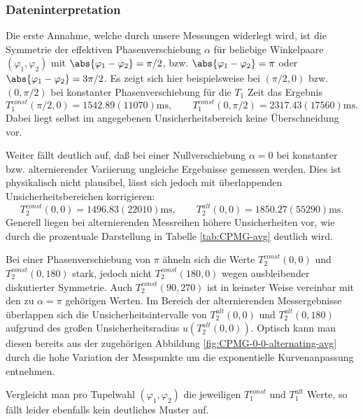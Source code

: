 \documentclass{article}
\begin{document}
        \subsubsection*{Dateninterpretation}
            Die erste Annahme, welche durch unsere Messungen widerlegt wird, ist die Symmetrie der effektiven Phasenverschiebung $\alpha$ für beliebige Winkelpaare $(\varphi_1,\varphi_2)$ mit $\abs{\varphi_1 - \varphi_2} = \pi/2$, bzw. $\abs{\varphi_1 - \varphi_2} = \pi$ oder $\abs{\varphi_1 - \varphi_2} = 3\pi/2$. Es zeigt sich hier beispielsweise bei $(\pi/2,0)$ bzw. $(0,\pi/2)$ bei konstanter Phasenverschiebung für die $T_1$ Zeit das Ergebnis
            \[
                T_1^{\textit{const}}(\pi/2,0) = 1542.89(11070)\si{\ms},\qquad T_1^{\textit{const}}(0,\pi/2) = 2317.43(17560)\si{\ms}.
            \]
            Dabei liegt selbst im angegebenen Unsicherheitsbereich keine Überschneidung vor. 

            Weiter fällt deutlich auf, daß bei einer Nullverschiebung $\alpha = 0$ bei konstanter bzw. alternierender Variierung ungleiche Ergebnisse gemessen werden. Dies ist physikalisch nicht plausibel, lässt sich jedoch mit überlappenden Unsicherheitsbereichen korrigieren:
            \[
                T_2^{\textit{const}}(0,0) = 1496.83(22010)\si{\ms},\qquad T_2^{\textit{alt}}(0,0) = 1850.27(55290)\si{\ms}.
            \]
            Generell liegen bei alternierenden Messreihen höhere Unsicherheiten vor, wie durch die prozentuale Darstellung in Tabelle \ref{tab:CPMG-avg} deutlich wird. 

            Bei einer Phasenverschiebung von $\pi$ ähneln sich die Werte $T_2^{\textit{const}}(0,0)$ und $T_2^{\textit{const}}(0,180)$ stark, jedoch nicht $T_2^{\textit{const}}(180,0)$ wegen ausbleibender diskutierter Symmetrie. Auch $T_2^{\textit{const}}(90,270)$ ist in keinster Weise vereinbar mit den zu $\alpha = \pi$ gehörigen Werten. Im Bereich der alternierenden Messergebnisse überlappen sich die Unsicherheitsintervalle von $T_2^{\textit{alt}}(0,0)$ und $T_2^{\textit{alt}}(0,180)$ aufgrund des großen Unsicherheitsradius $u(T_2^{\textit{alt}}(0,0))$. Optisch kann man diesen bereits aus der zugehörigen Abbildung \ref{fig:CPMG-0-0-alternating-avg} durch die hohe Variation der Messpunkte um die exponentielle Kurvenanpassung entnehmen.
            
            Vergleicht man pro Tupelwahl $(\varphi_1,\varphi_2)$ die jeweiligen $T_1^{\textit{const}}$ und $T_1^{\textit{alt}}$ Werte, so fällt leider ebenfalls kein deutliches Muster auf. 
\end{document}

